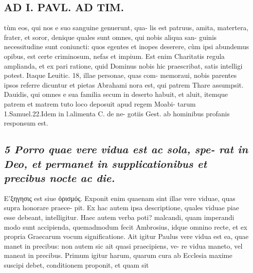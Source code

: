 \documentclass{article}
\begin{document}
\begin{pages}
\section*{AD I. PAVL. AD TIM. }
\marginpar{[ p.256 ]}\pstart tùm eos, qui nos e suo sanguine genuerunt, qua- lis est patruus, amita, matertera, frater, et soror, denique quales sunt omnes, qui nobis aliqua san- guinis necessitudine sunt coniuncti: quos egentes et inopes deserere, cùm ipsi abundemus opibus, est certe criminosum, nefas et impium. Est enim Charitatis regula amplianda, et ex pari ratione, quid Dominus nobis hic praescribat, satis intelligi potest. Itaque Leuitic. 18, illae personae, quas com- memoraui, nobis parentes ipsos referre dicuntur et pietas Abrahami nora est, qui patrem Thare assumpsit. Dauidis, qui omnes e sua familia secum in deserto habuit, et aluit, itemque patrem et matrem tuto loco deposuit apud regem Moabi- tarum 1.Samuel.22.Idem in l.alimenta C. de ne- gotiis Gest. ab hominibus profanis responsum est.  \pend
{}
{}
\subsection*{\textit{5 Porro quae vere vidua est ac sola, spe- rat in Deo, et permanet in supplicationibus et precibus nocte ac die. }}\pstart Ε’ξηγησις est siue ὁρισμός. Exponit enim quaenam sint illae vere viduae, quas supra honorare praece- pit. Ex hac autem ipsa descriptione, quales viduae piae esse debeant, intelligitur. Haec autem verba poti? malcandi, quam imperandi modo sunt accipienda, quemadmodum fecit Ambrosius, idque omnino recte, et ex propria Graecarum vocum significatione. Ait igitur Paulus vere vidua est ea, quae manet in precibus: non autem sic ait quasi praecipiens, ve- re vidua maneto, vel maneat in precibus. Primum igitur harum, quarum cura ab Ecclesia maxime suscipi debet, conditionem proponit, et quam sit  \pend

\end{pages}
\end{document}
